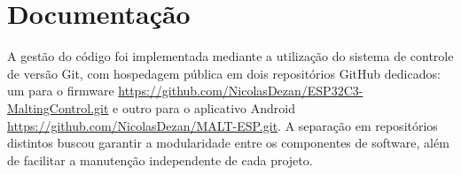 \section{Documentação}
A gestão do código foi implementada mediante a utilização do sistema de controle de versão Git, com hospedagem pública em dois repositórios GitHub dedicados: um para o firmware \url{https://github.com/NicolasDezan/ESP32C3-MaltingControl.git} e outro para o aplicativo Android \url{https://github.com/NicolasDezan/MALT-ESP.git}. A separação em repositórios distintos buscou garantir a modularidade entre os componentes de software, além de facilitar a manutenção independente de cada projeto.

